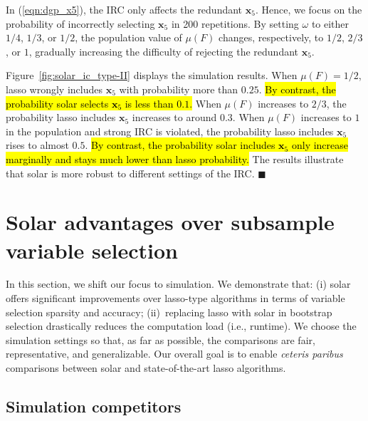 \documentclass[11pt,review,authoryear]{elsarticle}
\begin{document}
In (\ref{eqn:dgp_x5}), the IRC only affects the redundant $\mathbf{x}_5$. Hence, we focus on the probability of incorrectly selecting $\mathbf{x}_5$ in 200 repetitions. By setting $\omega$ to either $1/4$, $1/3$, or $1/2$, the population value of $\mu \left( F \right)$ changes, respectively, to $1/2$, $2/3$, or $1$, gradually increasing the difficulty of rejecting the redundant $\mathbf{x}_5$.

Figure~\ref{fig:solar_ic_type-II} displays the simulation results. When $\mu \left( F \right) = 1/2$, lasso wrongly includes $\mathbf{x}_5$ with probability more than $0.25$. \hl{By contrast, the probability solar selects $\mathbf{x}_5$ is less than $0.1$.} When $\mu \left( F \right)$ increases to $2/3$, the probability lasso includes $\mathbf{x}_5$ increases to around $0.3$. When $\mu \left( F \right)$ increases to $1$ in the population and strong IRC is violated, the probability lasso includes $\mathbf{x}_5$ rises to almost $0.5$. \hl{By contrast, the probability solar includes $\mathbf{x}_5$ only increase marginally and stays much lower than lasso probability.} The results illustrate that solar is more robust to different settings of the IRC. $\blacksquare$



\section{Solar advantages over subsample variable selection\label{section:comp}}

In this section, we shift our focus to simulation. We demonstrate that: (i) solar offers significant improvements over lasso-type algorithms in terms of variable selection sparsity and accuracy; (ii)~replacing lasso with solar in bootstrap selection drastically reduces the computation load (i.e., runtime). We choose the simulation settings so that, as far as possible, the comparisons are fair, representative, and generalizable. Our overall goal is to enable \emph{ceteris paribus} comparisons between solar and state-of-the-art lasso algorithms.

\subsection{Simulation competitors}
\end{document}
